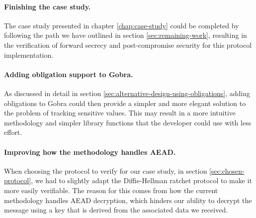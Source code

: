 \paragraph{Finishing the case study.}
The case study presented in chapter \ref{chap:case-study} could be completed by following the path we have outlined in section \ref{sec:remaining-work}, resulting in the verification of forward secrecy and post-compromise security for this protocol implementation.

\paragraph{Adding obligation support to Gobra.}
As discussed in detail in section \ref{sec:alternative-design-using-obligations}, adding obligations to Gobra could then provide a simpler and more elegant solution to the problem of tracking sensitive values.
This may result in a more intuitive methodology and simpler library functions that the developer could use with less effort.

\paragraph{Improving how the methodology handles AEAD.}
When choosing the protocol to verify for our case study, in section \ref{sec:chosen-protocol}, we had to slightly adapt the Diffie-Hellman ratchet protocol to make it more easily verifiable.
The reason for this comes from how the current methodology handles AEAD decryption, which hinders our ability to decrypt the message using a key that is derived from the associated data we received.
